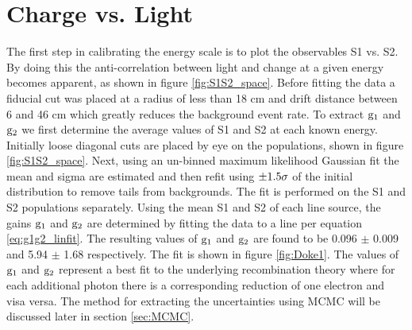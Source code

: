 \section{Charge vs. Light}
\label{sec:Doke1}
The first step in calibrating the energy scale is to plot the observables S1 vs. S2. By doing this the anti-correlation between light and change at a given energy becomes apparent, as shown in figure \ref{fig:S1S2_space}. Before fitting the data a fiducial cut was placed at a radius of less than 18 cm and drift distance between 6 and 46 cm which greatly reduces the background event rate. To extract $\rm g_1$ and $\rm g_2$ we first determine the average values of S1 and S2 at each known energy. Initially loose diagonal cuts are placed by eye on the populations, shown in figure \ref{fig:S1S2_space}. Next, using an un-binned maximum likelihood Gaussian fit the mean and sigma are estimated and then refit using $\rm \pm 1.5\sigma$ of the initial distribution to remove tails from backgrounds. The fit is performed on the S1 and S2 populations separately. Using the mean S1 and S2 of each line source, the gains $\rm g_1$ and $\rm g_2$ are determined by fitting the data to a line per equation \ref{eq:g1g2_linfit}. The resulting values of $\rm g_1$ and $\rm g_2$ are found to be 0.096 $\pm$ 0.009 and 5.94 $\pm$ 1.68 respectively. The fit is shown in figure \ref{fig:Doke1}. The values of $\rm g_1$ and $\rm g_2$ represent a best fit to the underlying recombination theory where for each additional photon there is a corresponding reduction of one electron and visa versa. The method for extracting the uncertainties using MCMC will be discussed later in section \ref{sec:MCMC}.

\newpage

